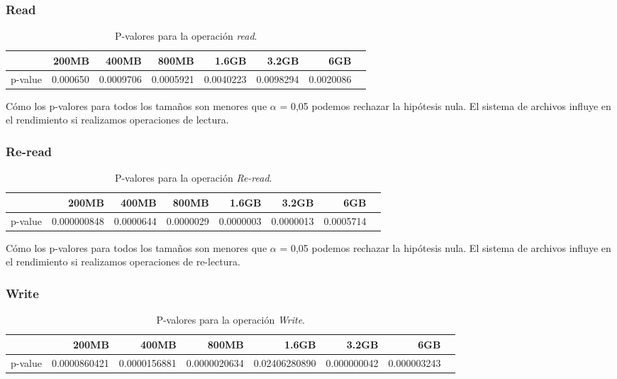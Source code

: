 \subsubsection{Read}
\begin{table}[!htp]\centering
\scriptsize
\begin{tabular}{lrrrrrrr}\toprule
&200MB &400MB &800MB &1.6GB &3.2GB &6GB \\\midrule
p-value &0.000650 &0.0009706 &0.0005921 &0.0040223 &0.0098294 &0.0020086 \\
\bottomrule
\end{tabular}
\caption{P-valores para la operación \textit{read}.}\label{tab: }
\end{table}

Cómo los p-valores para todos los tamaños son menores que $\alpha$ = 0,05 podemos rechazar la hipótesis nula. El sistema de archivos influye en el rendimiento si realizamos operaciones de lectura. 

\subsubsection{Re-read}
\begin{table}[!htp]\centering
\scriptsize
\begin{tabular}{lrrrrrrr}\toprule
&200MB &400MB &800MB &1.6GB &3.2GB &6GB \\\midrule
p-value &0.000000848 &0.0000644 &0.0000029 &0.0000003 &0.0000013 &0.0005714 \\
\bottomrule
\end{tabular}
\caption{P-valores para la operación \textit{Re-read}.}\label{tab: }
\end{table}

Cómo los p-valores para todos los tamaños son menores que $\alpha$ = 0,05 podemos rechazar la hipótesis nula. El sistema de archivos influye en el rendimiento si realizamos operaciones de re-lectura. 


\subsubsection{Write}
\begin{table}[!htp]\centering
\scriptsize
\begin{tabular}{lrrrrrrr}\toprule
&200MB &400MB &800MB &1.6GB &3.2GB &6GB \\\midrule
p-value &0.0000860421 &0.0000156881 &0.0000020634 &0.02406280890 &0.000000042 &0.000003243 \\
\bottomrule
\end{tabular}
\caption{P-valores para la operación \textit{Write}.}\label{tab: }
\end{table}

